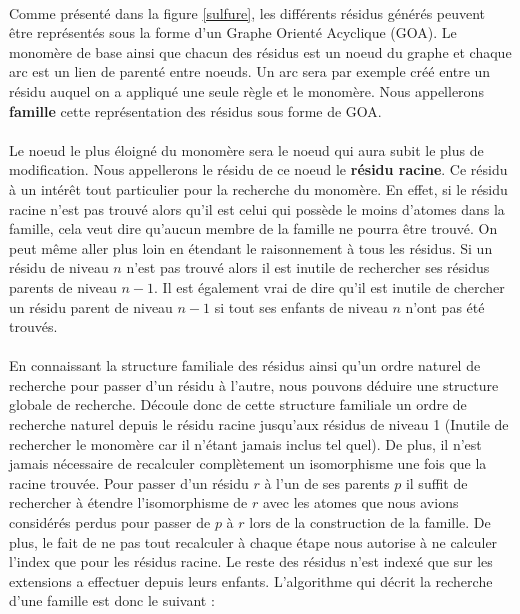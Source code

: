 \documentclass[12pt,french,twoside]{report}
\begin{document}
\paragraph{}Comme présenté dans la figure \ref{sulfure}, les différents résidus générés peuvent être représentés sous la forme
d'un Graphe Orienté Acyclique (GOA). Le monomère de base ainsi que chacun des résidus est un noeud du graphe et chaque arc est un
lien de parenté entre noeuds. Un arc sera par exemple créé entre un résidu auquel on a appliqué une seule règle et le monomère.
Nous appellerons \textbf{famille} cette représentation des résidus sous forme de GOA.

\paragraph{}Le noeud le plus éloigné du monomère sera le noeud
qui aura subit le plus de modification. Nous appellerons le résidu de ce noeud le \textbf{résidu racine}. Ce résidu à un intérêt
tout particulier pour la recherche du monomère. En effet, si le résidu racine n'est pas trouvé alors qu'il est celui
qui possède le moins d'atomes dans la famille, cela veut dire qu'aucun membre de la famille ne pourra être trouvé. On peut même
aller plus loin en étendant le raisonnement à tous les résidus. Si un résidu de niveau $n$ n'est pas trouvé alors il est inutile
de rechercher ses résidus parents de niveau $n-1$. Il est également vrai de dire qu'il est inutile de chercher un résidu parent de
niveau $n-1$ si tout ses enfants de niveau $n$ n'ont pas été trouvés.

\paragraph{}En connaissant la structure familiale des résidus ainsi qu'un ordre naturel de recherche pour passer d'un résidu à
l'autre, nous pouvons déduire une structure globale de recherche. Découle donc de cette structure familiale un ordre de recherche
naturel depuis le résidu racine jusqu'aux résidus de niveau 1 (Inutile de rechercher le monomère car il n'étant jamais inclus tel
quel). De plus, il n'est jamais nécessaire de
recalculer complètement un isomorphisme une fois que la racine trouvée. Pour passer d'un résidu $r$ à l'un de ses parents $p$ il
suffit de rechercher à étendre l'isomorphisme de $r$ avec les atomes que nous avions considérés perdus pour passer de $p$ à $r$
lors de la construction de la famille. De plus, le fait de ne pas tout recalculer à chaque étape nous autorise à ne calculer
l'index que pour les résidus racine. Le reste des résidus n'est indexé que sur les extensions a effectuer depuis leurs enfants.
L'algorithme qui décrit la recherche d'une famille est donc le suivant :
\end{document}
